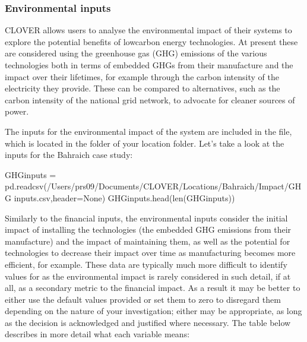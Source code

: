 \documentclass[letterpaper,10pt,english]{sphinxmanual}
\begin{document}
\sphinxAtStartPar
{}  


\subsubsection{Environmental inputs}
\label{\detokenize{optimisation:environmental-inputs}}
\sphinxAtStartPar
CLOVER allows users to analyse the environmental impact of their systems
to explore the potential benefits of low\sphinxhyphen{}carbon energy technologies. At
present these are considered using the greenhouse gas (GHG) emissions of
the various technologies both in terms of embedded GHGs from their
manufacture and the impact over their lifetimes, for example through the
carbon intensity of the electricity they provide. These can be compared
to alternatives, such as the carbon intensity of the national grid
network, to advocate for cleaner sources of power.

\sphinxAtStartPar
The inputs for the environmental impact of the system are included in
the  file, which is located in the  folder of your
location folder. Let’s take a look at the inputs for the Bahraich case
study:

\begin{sphinxVerbatim}[commandchars=\\\{\}]
GHG\PYGZus{}inputs = pd.read\PYGZus{}csv(\PYGZdq{}/Users/prs09/Documents/CLOVER/Locations/Bahraich/Impact/GHG inputs.csv\PYGZdq{},header=None)
GHG\PYGZus{}inputs.head(len(GHG\PYGZus{}inputs))
\end{sphinxVerbatim}



\begin{DUlineblock}{0em}
\item[] 
\end{DUlineblock}

\sphinxAtStartPar
Similarly to the financial inputs, the environmental inputs consider the
initial impact of installing the technologies (the embedded GHG
emissions from their manufacture) and the impact of maintaining them, as
well as the potential for technologies to decrease their impact over
time as manufacturing becomes more efficient, for example. These data
are typically much more difficult to identify values for as the
environmental impact is rarely considered in such detail, if at all, as
a secondary metric to the financial impact. As a result it may be better
to either use the default values provided or set them to zero to
disregard them depending on the nature of your investigation; either may
be appropriate, as long as the decision is acknowledged and justified
where necessary. The table below describes in more detail what each
variable means:
\end{document}
